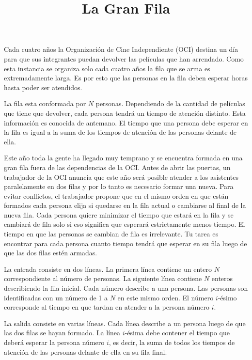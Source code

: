 \documentclass{oci}
\title{La Gran Fila}
\begin{document}
\maketitle

Cada cuatro años la Organización de Cine Independiente (OCI) destina un día para que sus integrantes puedan devolver las películas que han arrendado.
Como esta instancia se organiza solo cada cuatro años la fila que se arma es extremadamente larga.
Es por esto que las personas en la fila deben esperar horas hasta poder ser atendidos.

La fila esta conformada por $N$ personas.
Dependiendo de la cantidad de películas que tiene que devolver, cada persona tendrá un tiempo de atención distinto.
Esta información es conocida de antemano.
El tiempo que una persona debe esperar en la fila es igual a la suma de los tiempos de atención de las personas delante de ella.

Este año toda la gente ha llegado muy temprano y se encuentra formada en una gran fila fuera de las dependencias de la OCI.
Antes de abrir las puertas, un trabajador de la OCI anuncia que este año será posible atender a los asistentes paralelamente en dos filas y por lo tanto es necesario formar una nueva.
Para evitar conflictos, el trabajador propone que en el mismo orden en que están formados cada persona elija si quedarse en la fila actual o cambiarse al final de la nueva fila.
Cada persona quiere minimizar el tiempo que estará en la fila y se cambiará de fila solo si eso significa que esperará estrictamente menos tiempo.
El tiempo en que las personas se cambian de fila es irrelevante.
Tu tarea es encontrar para cada persona cuanto tiempo tendrá que esperar en su fila luego de que las dos filas estén armadas.

\begin{inputDescription}
  La entrada consiste en dos líneas.
La primera línea contiene un entero $N$ correspondiente al número de personas.
La siguiente línea contiene $N$ enteros describiendo la fila inicial.
Cada número describe a una persona.
Las personas son identificadas con un número de 1 a $N$ en este mismo orden.
El número $i$-ésimo corresponde al tiempo en que tardan en atender a la persona número $i$.
\end{inputDescription}

\begin{outputDescription}
  La salida consiste en varias líneas.
  Cada línea describe a un persona luego de que las dos filas se hayan formado.
  La línea $i$-ésima debe contener el tiempo que deberá esperar la persona número $i$, es decir, la suma de todos los tiempos de atención de las personas delante de ella en su fila final.
\end{outputDescription}
\end{document}

